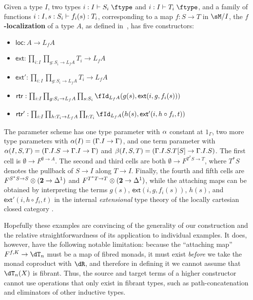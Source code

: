 \documentclass{amsart}
\let\type\fibtype
\begin{document}
\begin{eg}
  Given a type $I$, two types $i:I\types S_i\type$ and $i:I\types T_i\type$, and a family of functions $i:I,s:S_i \vdash f_i(s) : T_i$, corresponding to a map $f:S\to T$ in $\sM/I$, the \textbf{$f$-localization} of a type $A$, as defined in~\cite{rss:modalities}, has five constructors:
  \begin{itemize}
  \item $\mathsf{loc}:A\to L_f A$
  \item $\mathsf{ext}:\prod_{i:I} \prod_{g:S_i \to L_f A} T_i \to L_f A$
  \item $\mathsf{ext}':\prod_{i:I} \prod_{g:S_i \to L_f A} T_i \to L_f A$
  \item $\mathsf{rtr}:\prod_{i:I} \prod_{g:S_i \to L_f A} \prod_{s:S_i} \id[L_f A]{g(s)}{\mathsf{ext}(i,g,f_i(s))}$
  \item $\mathsf{rtr}':\prod_{i:I} \prod_{h:T_i \to L_f A} \prod_{t:T_i} \id[L_f A]{h(s)}{\mathsf{ext}'(i,h\circ f_i,t)}$
  \end{itemize}
  The parameter scheme has one type parameter with $\alpha$ constant at $1_\Gamma$, two more type parameters with $\alpha(I) = (\Gamma.I\to\Gamma)$, and one term parameter with $\alpha(I,S,T) = (\Gamma.I.S\to \Gamma.I\to\Gamma)$ and $\beta(I,S,T) = (\Gamma.I.S.T[S] \to \Gamma.I.S)$.
  The first cell is $\emptyset \to F^{\emptyset\to A}$.
  The second and third cells are both $\emptyset \to F^{T^*S \to T}$, where $T^*S$ denotes the pullback of $S\to I$ along $T\to I$.
  Finally, the fourth and fifth cells are $F^{S^*S\to S} \otimes (\mathbf{2}\to {\Delta^1})$ and $F^{T^*T\to T} \otimes (\mathbf{2}\to {\Delta^1})$, while the attaching maps can be obtained by interpreting the terms $g(s)$, ${\mathsf{ext}(i,g,f_i(s))}$, $h(s)$, and ${\mathsf{ext}'(i,h\circ f_i,t)}$ in the internal \emph{extensional} type theory of the locally cartesian closed category \sM.
\end{eg}

Hopefully these examples are convincing of the generality of our construction and the relative straightforwardness of its application to individual examples.
It does, however, have the following notable limitation: because the ``attaching map'' $F^{f,K}\to \dT_n$ must be a map of fibred monads, it must exist \emph{before} we take the monad coproduct with $\dR$, and therefore in defining it we cannot assume that $\dT_n(X)$ is fibrant.
Thus, the source and target terms of a higher constructor cannot use operations that only exist in fibrant types, such as path-concatenation and eliminators of other inductive types.
\end{document}

